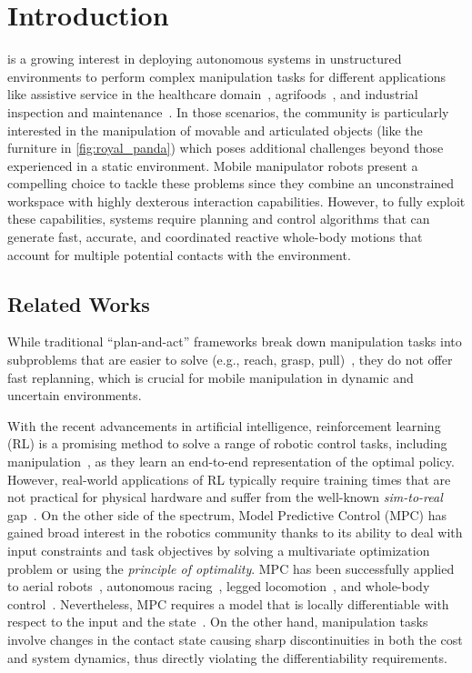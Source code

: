 \section{Introduction} \label{sec:introduction}
\showthe\font
{} is a growing interest in deploying autonomous systems in unstructured environments to perform complex manipulation tasks for different applications like assistive service in the healthcare domain~\cite{cooper2020ari}, agrifoods~\cite{duckett2018agricultural}, and industrial inspection and maintenance~\cite{lattanzi2017review}. In those scenarios, the community is particularly interested in the manipulation of movable and articulated objects (like the furniture in \fig\ref{fig:royal_panda}) which poses additional challenges beyond those experienced in a static environment. Mobile manipulator robots present a compelling choice to tackle these problems since they combine an unconstrained workspace with highly dexterous interaction capabilities. However, to fully exploit these capabilities, systems require planning and control algorithms that can generate fast, accurate, and coordinated reactive whole-body motions that account for multiple potential contacts with the environment. 

\subsection{Related Works}

While traditional ``plan-and-act'' frameworks break down manipulation tasks into subproblems that are easier to solve (e.g., reach, grasp, pull)~\cite{Murali2020}, they do not offer fast replanning, which is crucial for mobile manipulation in dynamic and uncertain environments.


With the recent advancements in artificial intelligence, reinforcement learning (RL) is a promising method to solve a range of robotic control tasks, including manipulation~\cite{finn2016deep}, as they learn an end-to-end representation of the optimal policy. However, real-world applications of RL typically require training times that are not practical for physical hardware and suffer from the well-known \textit{sim-to-real} gap~\cite{chebotar2019closing}. 
On the other side of the spectrum, Model Predictive Control (MPC) has gained broad interest in the robotics community thanks to its ability to deal with input constraints and task objectives by solving a multivariate optimization problem or using the \textit{principle of optimality}. 
MPC has been successfully applied to aerial robots~\cite{peric2021direct}, autonomous racing~\cite{liniger2015optimization}, legged locomotion~\cite{grandia2019frequency}, and whole-body control~\cite{minniti2019whole}. 
Nevertheless, MPC requires a model that is locally differentiable with respect to the input and the state~\cite{buchli2017optimal}. On the other hand, manipulation tasks involve changes in the contact state causing sharp discontinuities in both the cost and system dynamics, thus directly violating the differentiability requirements. 


